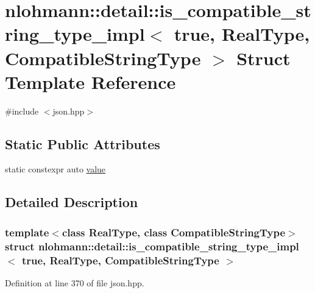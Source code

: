 \hypertarget{structnlohmann_1_1detail_1_1is__compatible__string__type__impl_3_01true_00_01_real_type_00_01_compatible_string_type_01_4}{}\section{nlohmann\+:\+:detail\+:\+:is\+\_\+compatible\+\_\+string\+\_\+type\+\_\+impl$<$ true, Real\+Type, Compatible\+String\+Type $>$ Struct Template Reference}
\label{structnlohmann_1_1detail_1_1is__compatible__string__type__impl_3_01true_00_01_real_type_00_01_compatible_string_type_01_4}


{\ttfamily \#include $<$json.\+hpp$>$}

\subsection*{Static Public Attributes}
\begin{DoxyCompactItemize}
\item 
static constexpr auto \hyperlink{structnlohmann_1_1detail_1_1is__compatible__string__type__impl_3_01true_00_01_real_type_00_01_compatible_string_type_01_4_ad608328215f6221af6b7eb66548b119c}{value}
\end{DoxyCompactItemize}


\subsection{Detailed Description}
\subsubsection*{template$<$class Real\+Type, class Compatible\+String\+Type$>$\newline
struct nlohmann\+::detail\+::is\+\_\+compatible\+\_\+string\+\_\+type\+\_\+impl$<$ true, Real\+Type, Compatible\+String\+Type $>$}



Definition at line 370 of file json.\+hpp.



